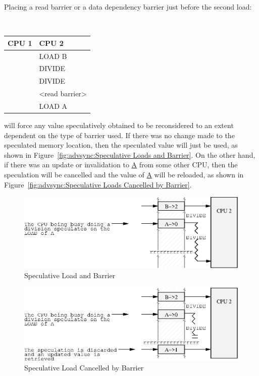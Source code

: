 Placing a read barrier or a data dependency barrier just before the second
load:

\vspace{5pt}
\begin{minipage}[t]{\columnwidth}
\tt
\begin{tabular}{l|p{1.5in}}
	CPU 1 &		CPU 2 \\
	\hline
		&	LOAD B \\
		&	DIVIDE \\
		&	DIVIDE \\
		&	<read barrier> \\
		&	LOAD A \\
\end{tabular}
\end{minipage}
\vspace{5pt}

will force any value speculatively obtained to be reconsidered to an extent
dependent on the type of barrier used.  If there was no change made to the
speculated memory location, then the speculated value will just be used,
as shown in
Figure~\ref{fig:advsync:Speculative Loads and Barrier}.
On the other hand, if there was an update or invalidation to \url{A}
from some other CPU, then the speculation will be cancelled and the
value of \url{A} will be reloaded,
as shown in Figure~\ref{fig:advsync:Speculative Loads Cancelled by Barrier}.

\begin{figure}[htb]
\begin{center}
\includegraphics{advsync/SpeculativeLoadBarrier}
\end{center}
\caption{Speculative Load and Barrier}
\end{figure}

\begin{figure}[htb]
\begin{center}
\includegraphics{advsync/SpeculativeLoadBarrierCancel}
\end{center}
\caption{Speculative Load Cancelled by Barrier}
\end{figure}

